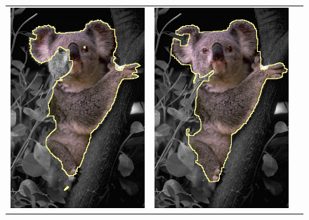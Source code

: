 \documentclass[smallextended]{svjour3}       %
\begin{document}
{{\begin{figure}[ht!]
\begin{tabular}{ccc}
 	\includegraphics[scale=0.25]{segmentation_bc_coala_grabcut-seg.png} & 
	\includegraphics[scale=0.25]{segmentation_bc_coala_r3_lg1_sq0_dt1_it50.png} &

\end{tabular}
\end{figure}}}
\end{document}
